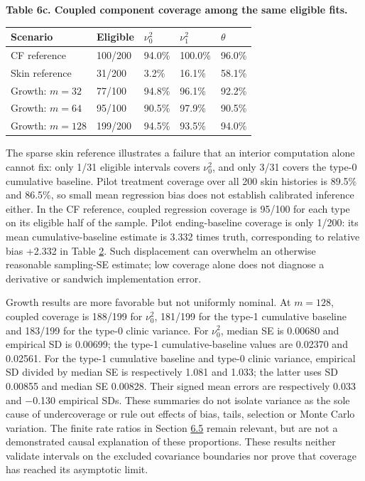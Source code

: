 \documentclass[11pt]{article}
\begin{document}
\label{tab:6c}
\textbf{Table 6c. Coupled component coverage among the same eligible fits.}

{
\begin{longtable}{lllll}
\toprule
\textbf{Scenario} & \textbf{Eligible} & \textbf{\(\nu_0^2\)} & \textbf{\(\nu_1^2\)} & \textbf{\(\theta\)} \\
\midrule
\endhead
\bottomrule
\endlastfoot
CF reference & 100/200 & 94.0\% & 100.0\% & 96.0\% \\
Skin reference & 31/200 & 3.2\% & 16.1\% & 58.1\% \\
Growth: \(m=32\) & 77/100 & 94.8\% & 96.1\% & 92.2\% \\
Growth: \(m=64\) & 95/100 & 90.5\% & 97.9\% & 90.5\% \\
Growth: \(m=128\) & 199/200 & 94.5\% & 93.5\% & 94.0\% \\
\end{longtable}}

The sparse skin reference illustrates a failure that an interior computation alone cannot fix: only 1/31 eligible intervals covers \(\nu_0^2\), and only 3/31 covers the type-0 cumulative baseline. Pilot treatment coverage over all 200 skin histories is 89.5\% and 86.5\%, so small mean regression bias does not establish calibrated inference either. In the CF reference, coupled regression coverage is 95/100 for each type on its eligible half of the sample. Pilot ending-baseline coverage is only 1/200: its mean cumulative-baseline estimate is 3.332 times truth, corresponding to relative bias +2.332 in Table \hyperref[tab:2]{2}. Such displacement can overwhelm an otherwise reasonable sampling-SE estimate; low coverage alone does not diagnose a derivative or sandwich implementation error.

Growth results are more favorable but not uniformly nominal. At \(m=128\), coupled coverage is 188/199 for \(\nu_0^2\), 181/199 for the type-1 cumulative baseline and 183/199 for the type-0 clinic variance. For \(\nu_0^2\), median SE is 0.00680 and empirical SD is 0.00699; the type-1 cumulative-baseline values are 0.02370 and 0.02561. For the type-1 cumulative baseline and type-0 clinic variance, empirical SD divided by median SE is respectively 1.081 and 1.033; the latter uses SD 0.00855 and median SE 0.00828. Their signed mean errors are respectively 0.033 and $-$0.130 empirical SDs. These summaries do not isolate variance as the sole cause of undercoverage or rule out effects of bias, tails, selection or Monte Carlo variation. The finite rate ratios in Section \hyperref[sec:6.5]{6.5} remain relevant, but are not a demonstrated causal explanation of these proportions. These results neither validate intervals on the excluded covariance boundaries nor prove that coverage has reached its asymptotic limit.
\end{document}
